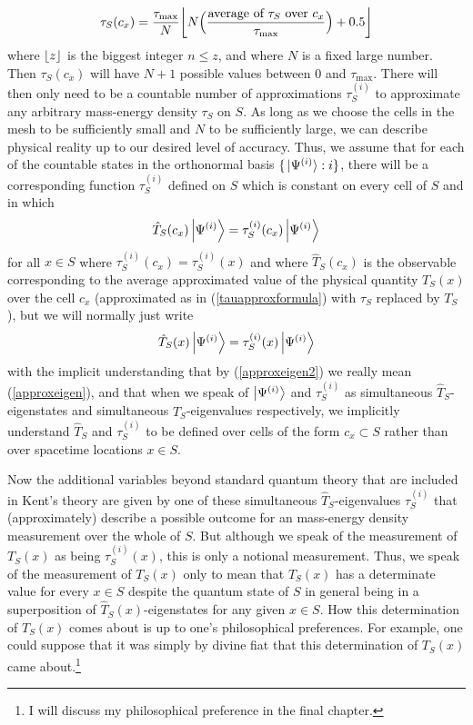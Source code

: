     \begin{equation}\label{tauapproxformula}
    \tau_S(c_x)=\frac{\tau_{\text{max}}}{N}\floor*{N\Big(\frac{\text{average of }\tau_S\text{ over }c_x}{\tau_{\text{max}}}\Big)+0.5}
    \end{equation}
    where $\floor*{z}$ is the biggest integer $n\leq z$, and where $N$ is a fixed large number. Then $\tau_S(c_x)$ will have $N+1$ possible values between $0$ and $\tau_{\text{max}}$.  There will then only need to be a countable number of approximations $\tau_S^{(i)}$ to approximate any arbitrary mass-energy density $\tau_S$ on $S$.  As long as we choose the cells in the mesh to be sufficiently small and $N$ to be sufficiently large, we can describe physical reality up to our desired level of accuracy. Thus, we assume that for each of the countable states in the orthonormal basis $\{\ket*{\Psi^{(i)}}:i\}$, there will be a corresponding function $\tau_S^{(i)}$ defined on $S$ which is constant on every cell of $S$ and in which 
\begin{equation}\label{approxeigen}
\hat{T}_S(c_x)\ket{\Psi^{(i)}}= \tau_S^{(i)}(c_x)\ket{\Psi^{(i)}}
\end{equation} 
for all $x\in S$ where $ \tau_S^{(i)}(c_x)= \tau_S^{(i)}(x)$ and where $\hat{T}_S(c_x)$ is the observable corresponding to the average approximated value of the physical quantity $T_S(x)$ over the cell $c_x$ (approximated as in (\ref{tauapproxformula}) with $\tau_S$ replaced by $T_S$), but we will normally just write
\begin{equation}\label{approxeigen2}
  \hat{T}_S(x)\ket{\Psi^{(i)}}= \tau_S^{(i)}(x)\ket{\Psi^{(i)}}
  \end{equation}
with the implicit understanding that by (\ref{approxeigen2}) we really mean (\ref{approxeigen}), and that when we speak of $\ket{\Psi^{(i)}}$ and $\tau_S^{(i)}$ as simultaneous $\hat{T}_S$-eigenstates and simultaneous $\hat{T}_S$-eigenvalues respectively, we implicitly understand $\hat{T}_S$ and $\tau_S^{(i)}$ to be defined over cells of the form $c_x\subset S$ rather than over spacetime locations $x\in S$.

Now the additional variables beyond standard quantum theory that are included in Kent's theory are given by one of these simultaneous $\hat{T}_S$-eigenvalues $\tau_S^{(i)}$ that (approximately) describe a possible outcome for an mass-energy density measurement over the whole of $S$.  But although we speak of the measurement of $T_S(x)$ as being $\tau_S^{(i)}(x)$, this is only a notional measurement. Thus, we speak of the measurement of  $T_S(x)$ only to mean that $T_S(x)$ has a determinate value for every $x\in S$ despite the quantum state of $S$ in general being in a superposition of $\hat{T}_S(x)$-eigenstates for any given $x\in S$. How this determination of $T_S(x)$ comes about is up to one's philosophical preferences. For example, one could suppose that it was simply by divine fiat that this determination  of $T_S(x)$ came about.\footnote{I will discuss my philosophical preference in the final chapter.} 


